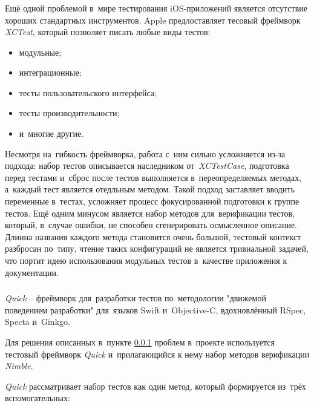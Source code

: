 \subsubsection{}
\label{sec:testing:tech:xctest}

Ещё одной проблемой в~мире тестирования iOS-приложений является отсутствие хороших стандартных инструментов. Apple предлоставляет тесовый фреймворк \textit{XCTest}, который позволяет писать любые виды тестов:

\begin{itemize}
	\item модульные;
	\item интеграционные;
	\item тесты пользовательского интерфейса;
	\item тесты производительности;
	\item и~многие другие.
\end{itemize}

Несмотря на~гибкость фреймворка, работа с~ним сильно усложняется из-за подхода: набор тестов описывается наследником от~\textit{XCTestCase}, подготовка перед тестами и~сброс после тестов выполняется в~переопределяемых методах, а~каждый тест является отедльным методом. Такой подход заставляет вводить переменные в~тестах, усложняет процесс фокусированной подготовки к группе тестов. Ещё одним минусом является набор методов для~верификации тестов, который, в~случае ошибки, не способен сгенерировать осмысленное описание. Длинна названия каждого метода становится очень большой, тестовый контекст разбросан по~типу, чтение таких конфигураций не является тривиальной задачей, что портит идею использования модульных тестов в~качестве приложения к документации.

\subsubsection{}
\label{sec:testing:tech:quick}
\textit{Quick} -- фреймворк для~разработки тестов по~методологии "движемой поведением разработки" для~языков Swift и~Objective-C, вдохновлённый RSpec, Specta и~Ginkgo\cite{github:quick}.

Для решения описанных в~пункте \ref{sec:testing:tech:xctest} проблем в~проекте используется тестовый фреймворк \textit{Quick} и~прилагающийся к нему набор методов верификации \textit{Nimble}.

\textit{Quick} рассматривает набор тестов как один метод, который формируется из~трёх вспомогательных:

